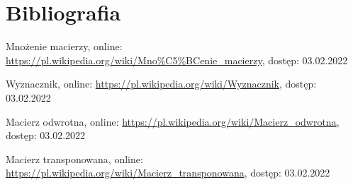 \documentclass[polish,10pt]{beamer}
\begin{document}
\section{Bibliografia}
\begin{thebibliography}{4}

Mnożenie macierzy, online: \url{https://pl.wikipedia.org/wiki/Mno%C5%BCenie_macierzy}, dostęp: 03.02.2022

Wyznacznik, online: \url{https://pl.wikipedia.org/wiki/Wyznacznik}, dostęp: 03.02.2022

Macierz odwrotna, online: \url{https://pl.wikipedia.org/wiki/Macierz_odwrotna}, dostęp: 03.02.2022

   Macierz transponowana, online: \url{https://pl.wikipedia.org/wiki/Macierz_transponowana}, dostęp: 03.02.2022

\end{thebibliography}
\end{document}
